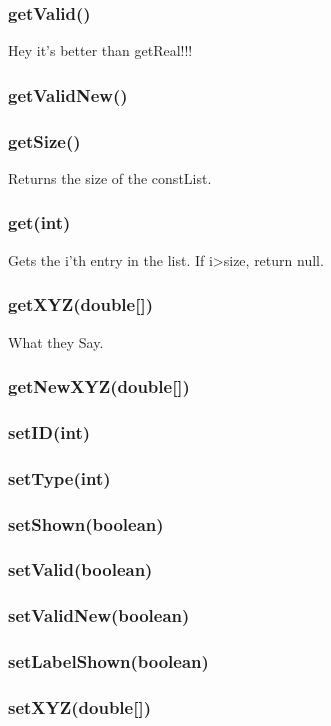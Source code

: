 \documentclass[a4paper,10pt]{report}
\begin{document}
\subsubsection{getValid()} Hey it's better than getReal!!!
\subsubsection{getValidNew()}
\subsubsection{getSize()} Returns the size of the constList.
\subsubsection{get(int)} Gets the i'th entry in the list. If i>size, return null.
\subsubsection{getXYZ(double[])} What they Say.
\subsubsection{getNewXYZ(double[])}
\subsubsection{setID(int)}
\subsubsection{setType(int)}
\subsubsection{setShown(boolean)}
\subsubsection{setValid(boolean)}
\subsubsection{setValidNew(boolean)}
\subsubsection{setLabelShown(boolean)}
\subsubsection{setXYZ(double[])}
\end{document}
